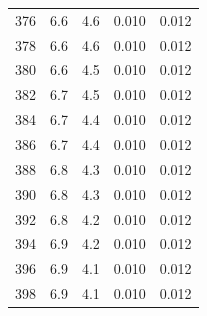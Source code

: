 \documentclass[10pt,twocolumn]{article}
\begin{document}
\begin{table}[!t]
\begin{minipage}[t]{0.48\textwidth}
\begin{tabular}{ccccc}
376 & 6.6 & 4.6 & 0.010 & 0.012 \\
378 & 6.6 & 4.6 & 0.010 & 0.012 \\
380 & 6.6 & 4.5 & 0.010 & 0.012 \\
382 & 6.7 & 4.5 & 0.010 & 0.012 \\
384 & 6.7 & 4.4 & 0.010 & 0.012 \\
386 & 6.7 & 4.4 & 0.010 & 0.012 \\
388 & 6.8 & 4.3 & 0.010 & 0.012 \\
390 & 6.8 & 4.3 & 0.010 & 0.012 \\
392 & 6.8 & 4.2 & 0.010 & 0.012 \\
394 & 6.9 & 4.2 & 0.010 & 0.012 \\
396 & 6.9 & 4.1 & 0.010 & 0.012 \\
398 & 6.9 & 4.1 & 0.010 & 0.012 \\
\bottomrule
\end{tabular}
\end{minipage}
\end{table}
\end{document}
